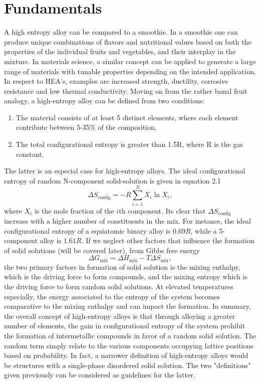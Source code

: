 \section{Fundamentals} 
A high entropy alloy can be compared to a smoothie. In a smoothie one can produce unique combinations of flavors and nutritional values based on both the properties of the individual fruits and vegetables, and their interplay in the mixture. In materials science, a similar concept can be applied to generate a large range of materials with tunable properties depending on the intended application. In respect to HEA's, examples are increased strength, ductility, corrosive resistance and low thermal conductivity. Moving on from the rather banal fruit analogy, a high-entropy alloy can be defined from two conditions:
\begin{enumerate}
    \item The material consists of at least 5 distinct elements, where each element contribute between 5-35$\%$ of the composition.
    \item The total configurational entropy is greater than 1.5R, where R is the gas constant. 
\end{enumerate}
The latter is an especial case for high-entropy alloys. The ideal configurational entropy of random N-component solid-solution is given in equation 2.1
\begin{equation}
\Delta S_{\text{config}} = -R \sum_{i=1}^{N}X_i\ln X_i,
\end{equation}
where $X_i$ is the mole fraction of the $i$th component. Its clear that $\Delta S_{\text{config}}$ increase with a higher number of constituents in the mix. For instance, the ideal configurational entropy of a equiatomic binary alloy is $0.69R$, while a 5-component alloy is $1.61R$. If we neglect other factors that influence the formation of solid solutions (will be covered later), from Gibbs free energy
\begin{equation}
\Delta G_{\text{mix}} = \Delta H_{\text{mix}} - T\Delta S_{\text{mix}},
\end{equation} 
the two primary factors in formation of solid solution is the mixing enthalpy, which is the driving force to form compounds, and the mixing entropy which is the driving force to form random solid solutions. At elevated temperatures especially, the energy associated to the entropy of the system becomes comparative to the mixing enthalpy and can impact the formation. In summary, the overall concept of high-entropy alloys is that through alloying a greater number of elements, the gain in configurational entropy of the system prohibit the formation of intermetallic compounds in favor of a random solid solution. The random term simply relate to the various components occupying lattice positions based on probability. In fact, a narrower definition of high-entropy alloys would be structures with a single-phase disordered solid solution. The two "definitions" given previously can be considered as guidelines for the latter.
 
